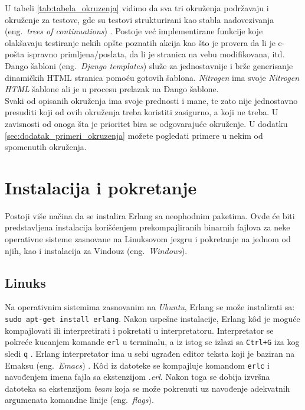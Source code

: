 \documentclass[a4paper]{article}
\begin{document}
{U tabeli \ref{tab:tabela_okruzenja} vidimo da sva tri okruženja podržavaju 
i okruženje za testove, gde su testovi strukturirani kao stabla nadovezivanja (eng.~{\em trees of continuations}) \cite{EvanMillerTesting}. 
Postoje već implementirane funkcije koje olakšavaju testiranje nekih opšte poznatih akcija kao što je 
provera da li je e-pošta ispravno primljena/poslata, da li je stranica na vebu modifikovana,  itd. \\

Đango šabloni (eng.~{\em Django templates}) \cite{DjangoTempDoc} služe za jednostavnije i brže generisanje dinamičkih HTML stranica pomoću gotovih šablona.
 {\em Nitrogen} ima svoje {\em Nitrogen HTML} šablone ali je u procesu prelazak na Đango šablone.\\
 
Svaki od opisanih okruženja ima svoje prednosti i mane, 
te zato nije jednostavno presuditi koji od ovih okruženja treba koristiti zasigurno, a koji ne treba. 
U zavisnosti od onoga šta je prioritet bira se odgovarajuće okruženje. 
U dodatku \ref{sec:dodatak_primeri_okruzenja} možete pogledati primere u nekim od spomenutih okruženja.

\section{Instalacija i pokretanje}
\label{sec:instalacija}
Postoji više načina da se instalira Erlang sa neophodnim paketima.
Ovde će biti predstavljena instalacija korišćenjem prekompajliranih binarnih fajlova 
za neke operativne sisteme zasnovane na Linuksovom jezgru i pokretanje na jednom od njih, kao i instalacija za Vindouz (eng.~{\em Windows}).


\subsection{Linuks}
\label{subsec:instalacijaLinux}
Na operativnim sistemima zasnovanim na {\em Ubuntu}, Erlang se može instalirati sa:
{\texttt{sudo apt-get install erlang}}. 
Nakon uspešne instalacije, Erlang k\^ od je moguće kompajlovati
ili interpretirati i pokretati u interpretatoru.
Interpretator se pokreće kucanjem komande {\texttt{erl}} u terminalu, a iz istog
se izlazi sa {\texttt{Ctrl+G}} iza kog sledi {\texttt{q}} \cite{book_joe}.
Erlang interpretator ima u sebi ugrađen editor teksta koji je baziran na Emaksu (eng.~{\em Emacs}) \cite{book_fred}.
K\^od iz datoteke se kompajluje komandom {\texttt{erlc}} i navođenjem imena fajla sa ekstenzijom {\em .erl}.
Nakon toga se dobija izvršna datoteka sa ekstenzijom {\em beam} koja se može
pokrenuti uz navođenje adekvatnih argumenata komandne linije (eng.~{\em flags}).

}
\end{document}

